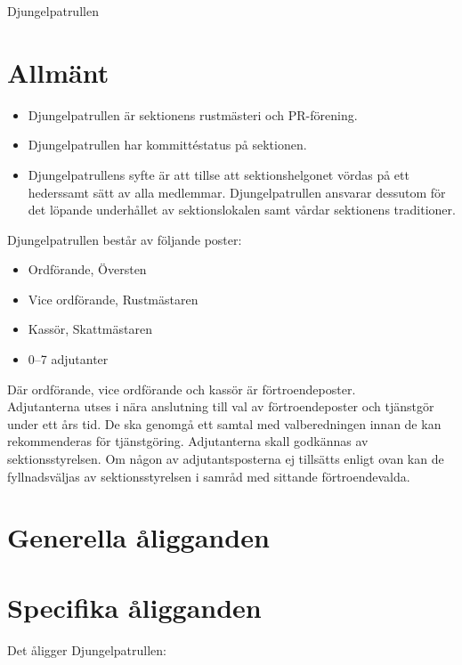 \documentclass[a4paper]{article}
\begin{document}
\renewcommand{\forening}{Djungelpatrullen} %

\begin{foreningenv}{\forening{}} %
    \section{Allmänt}
    \begin{itemize}
        \item Djungelpatrullen är sektionens rustmästeri och PR-förening.
        \item Djungelpatrullen har kommittéstatus på sektionen.
        \item Djungelpatrullens syfte är att tillse att sektionshelgonet vördas på ett hederssamt sätt av alla medlemmar. Djungelpatrullen ansvarar dessutom för det löpande underhållet av sektionslokalen samt vårdar sektionens traditioner.
    \end{itemize}
    Djungelpatrullen består av följande poster:
    \begin{itemize}
        \item Ordförande, Översten
        \item Vice ordförande, Rustmästaren
        \item Kassör, Skattmästaren
        \item 0--7 adjutanter
    \end{itemize}
    Där ordförande, vice ordförande och kassör är förtroendeposter. \\
    
    Adjutanterna utses i nära anslutning till val av förtroendeposter och tjänstgör under ett års tid. De ska genomgå ett samtal med valberedningen innan de kan rekommenderas för tjänstgöring. Adjutanterna skall godkännas av sektionsstyrelsen. Om någon av adjutantsposterna ej tillsätts enligt ovan kan de fyllnadsväljas av sektionsstyrelsen i samråd med sittande förtroendevalda.
    
    \section{Generella åligganden}
    \aliggkom{} %
    
    \section{Specifika åligganden}
    Det åligger Djungelpatrullen:

\end{foreningenv}
\end{document}
